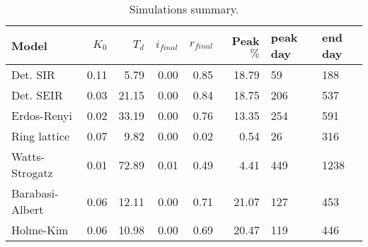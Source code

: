 \begin{table}[h]
\centering
\caption{Simulations summary.}
\label{tab:results}
\begin{tabular}{lrrrrrll}
\toprule
           Model & $K_0$ & $T_d$ & $i_{final}$ & $r_{final}$ & Peak $\%$ & peak day & end day \\
\midrule
        Det. SIR &  0.11 &  5.79 &        0.00 &        0.85 &     18.79 &       59 &     188 \\
       Det. SEIR &  0.03 & 21.15 &        0.00 &        0.84 &     18.75 &      206 &     537 \\
     Erdos-Renyi &  0.02 & 33.19 &        0.00 &        0.76 &     13.35 &      254 &     591 \\
    Ring lattice &  0.07 &  9.82 &        0.00 &        0.02 &      0.54 &       26 &     316 \\
  Watts-Strogatz &  0.01 & 72.89 &        0.01 &        0.49 &      4.41 &      449 &    1238 \\
 Barabasi-Albert &  0.06 & 12.11 &        0.00 &        0.71 &     21.07 &      127 &     453 \\
       Holme-Kim &  0.06 & 10.98 &        0.00 &        0.69 &     20.47 &      119 &     446 \\
\bottomrule
\end{tabular}
\end{table}
